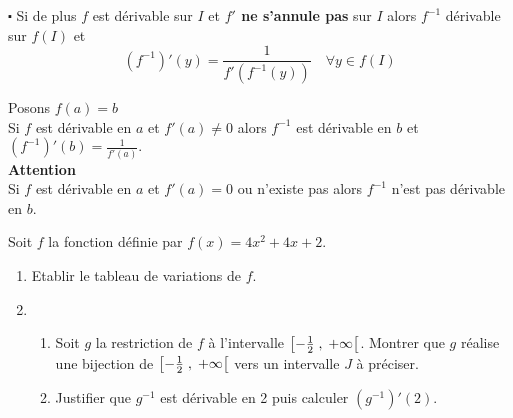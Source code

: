 \begin{example}


$ \centerdot $ Si de plus $ f $ est dérivable sur $ I $ et \textbf{\color{magenta} $ f'$ ne s'annule pas} sur  $ I $ alors $ f^{-1} $ dérivable sur $ f(I) $ et
 \[ (f^{-1})'(y)=\frac{1}{f'(f^{-1}(y))}\quad \forall y\in f(I)\]
\begin{remark}
Posons $ f(a)=b $ \\
Si $ f $ est dérivable en $ a $ et $ f'(a)\neq 0 $ alors $ f^{-1} $ est dérivable en $ b $ et $(f^{-1})'(b)=\frac{1}{f'(a)}.  $\\
\textbf{\color{red}Attention}\\
Si $ f $ est dérivable en $ a $ et \colorbox{magenta!20!} {$ f'(a)= 0 $ ou n'existe pas} alors $ f^{-1} $ n'est pas  dérivable en $ b. $
\end{remark}

\begin{exercice}
Soit $ f $ la fonction définie par $ f(x)=4x^{2}+4x+2  $.
 \begin{enumerate}
\item Etablir  le tableau de variations   de $ f $. 
\item
\begin{enumerate}
\item Soit $ g $ la restriction de $ f $ à l'intervalle  $ \left[-\frac{1}{2} \;,\; +\infty\right[ $.
 Montrer que  $ g $  réalise une bijection  de $ \left[-\frac{1}{2} \;,\; +\infty\right[ $ vers un intervalle  $ J $ à préciser.
\item Justifier que $ g^{-1} $ est dérivable en 2 puis  calculer $(g^{-1})'(2) $.
\end{enumerate}
\end{enumerate}


\end{exercice}
\end{example}

